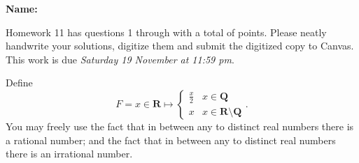 \documentclass[12pt,fleqn]{exam}
\newcommand{\reals}{\mathbf{R}}
\newcommand{\rationals}{\mathbf{Q}}
\newcommand{\ball}{\mathrm{ball}}
\newcommand\PM{{\sc pm}}
\newcommand{\quiz}{11}
\newcommand{\term}{Fall}
\newcommand{\due}{Saturday 19 November at 11:59 \PM}
\begin{document}
\large
\vspace{0.1in}
\noindent{}
{\bf Name:}  \\
\noindent \makebox[3.0truein][l]{\bf Homework \quiz, \term \/ \the\year}
\vspace{0.1in}

\begin{quote}
    \end{quote}
\noindent  Homework    \quiz\/  has questions 1 through  \numquestions \/ with 
a total of  \numpoints\/  points.  Please neatly handwrite your solutions, digitize them and
submit the digitized copy to Canvas. This work is due \emph{\due}.

\vspace{0.1in}


\begin{questions} 

\question Define 
\begin{equation}
  F = x \in \reals \mapsto \begin{cases} 
     \frac{x}{2}  & x \in \rationals \\
     x            & x \in \reals \setminus \rationals 
  \end{cases}.                                    
\end{equation}
You may freely use the fact that in between any to distinct real numbers there is a rational number; and the 
fact that in between any to distinct real numbers there is an irrational number.
\end{questions}
\end{document}
